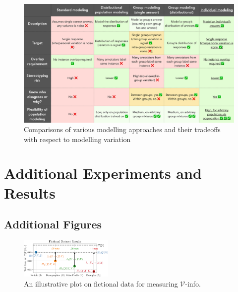 \documentclass[11pt]{article}
\begin{document}
\begin{figure}[h]
\centering
\includegraphics[width=\textwidth]{files/modelingvariation.pdf}
\caption{Comparisons of various modelling approaches and their tradeoffs with respect to modelling variation}
\label{fig:modellingvariation}
\end{figure}


\section{Additional Experiments and Results}
\label{app:additionalexperiments}

\subsection{Additional Figures}

\begin{figure}
\centering
\includegraphics[width=0.4\textwidth]{files/annotated_example_v2.pdf}
\small
\caption{
An illustrative plot on fictional data for measuring $\mathcal{V}$-info.
}
\label{fig:example}
\end{figure}
\end{document}
